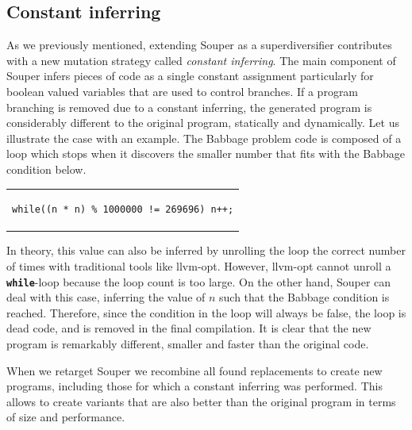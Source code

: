 
\subsection*{Constant inferring}

As we previously mentioned, extending Souper as a superdiversifier contributes with a new mutation strategy called \emph{constant inferring}. 
The main component of Souper infers pieces of code as a single constant assignment particularly for boolean valued variables that are used to control branches.
If a program branching is removed due to a constant inferring, the generated program is considerably different to the original program, statically and dynamically.
Let us illustrate the case with an example.
The Babbage problem code is composed of a loop which stops when it discovers the smaller number that fits with the Babbage condition below.
\begin{center}
\begin{tabular}{c}

\lstset{language=C++,
                    style=CStyle,
                    basicstyle=\small\ttfamily,
                    columns=fullflexible,
                    breaklines=true, 
                    postbreak=\mbox{\textcolor{red}{$\hookrightarrow$}\space}}
\begin{lstlisting}[]
while((n * n) % 1000000 != 269696) n++;
\end{lstlisting}
\end{tabular}
\end{center}
In theory, this value can also be inferred by unrolling the loop the correct number of times with traditional tools like llvm-opt.
However, llvm-opt cannot unroll a \texttt{\textbf{while}}-loop because the loop count is too large.
On the other hand, Souper can deal with this case, inferring the value of $n$ such that the Babbage condition is reached. Therefore, since the condition in the loop will always be false, the loop is dead code, and is removed in the final compilation. It is clear that the new program is remarkably different, smaller and faster than the original code.

When we retarget Souper we recombine all found replacements to create new programs, including those for which a constant inferring was performed.
This allows to create variants that are also better than the original program in terms of size and performance.

